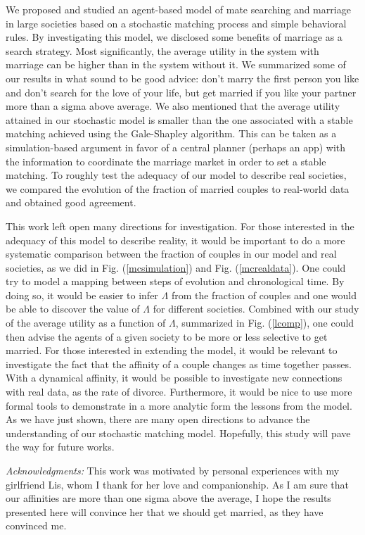 \documentclass[12pt]{article}
\begin{document}
We proposed and studied an agent-based model of mate searching and marriage in large societies based on a stochastic matching process and simple behavioral rules. By investigating this model, we disclosed some benefits of marriage as a search strategy. Most significantly, the average utility in the system with marriage can be higher than in the system without it. We summarized some of our results in what sound to be good advice: don't marry the first person you like and don't search for the love of your life, but get married if you like your partner more than a sigma above average. We also mentioned that the average utility attained in our stochastic model is smaller than the one associated with a stable matching achieved using the Gale-Shapley algorithm. This can be taken as a simulation-based argument in favor of a central planner (perhaps an app) with the information to coordinate the marriage market in order to set a stable matching. To roughly test the adequacy of our model to describe real societies, we compared the evolution of the fraction of married couples to real-world data and obtained good agreement.

This work left open many directions for investigation. For those interested in the adequacy of this model to describe reality, it would be important to do a more systematic comparison between the fraction of couples in our model and real societies, as we did in Fig. (\ref{mcsimulation}) and Fig. (\ref{mcrealdata}). One could try to model a mapping between steps of evolution and chronological time. By doing so, it would be easier to infer $\Lambda$ from the fraction of couples and one would be able to discover the value of $\Lambda$ for different societies. Combined with our study of the average utility as a function of $\Lambda$, summarized in Fig. (\ref{lcomp}), one could then advise the agents of a given society to be more or less selective to get married. For those interested in extending the model, it would be relevant to investigate the fact that the affinity of a couple changes as time together passes. With a dynamical affinity, it would be possible to investigate new connections with real data, as the rate of divorce. Furthermore, it would be nice to use more formal tools to demonstrate in a more analytic form the lessons from the model. As we have just shown, there are many open directions to advance the understanding of our stochastic matching model. Hopefully, this study will pave the way for future works.


\vspace{5mm}
\noindent
\textit{Acknowledgments:} This work was motivated by personal experiences with my girlfriend Lis, whom I thank for her love and companionship. As I am sure that our affinities are more than one sigma above the average, I hope the results presented here will convince her that we should get married, as they have convinced me.

\newpage


\end{document}
